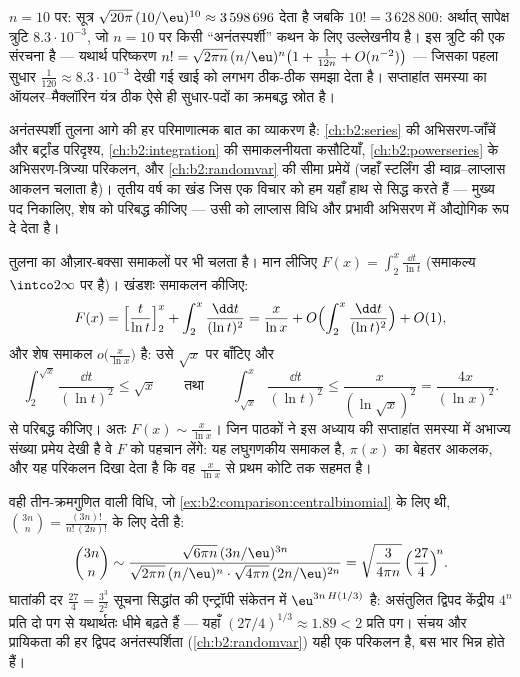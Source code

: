 \begin{example}[संख्याओं में स्टर्लिंग]\label{ex:b2:comparison:stirlingnum}
$n = 10$ पर: सूत्र $\sqrt{20\pi}\,(10/\eu)^{10}
\approx 3\,598\,696$ देता है जबकि $10! = 3\,628\,800$: अर्थात् सापेक्ष त्रुटि $8.3\cdot10^{-3}$, जो
$n = 10$ पर किसी ``अनंतस्पर्शी'' कथन के लिए उल्लेखनीय है। इस त्रुटि की एक
संरचना है --- यथार्थ परिष्करण $n!
= \sqrt{2\pi n}\,(n/\eu)^n\bigl(1 + \frac1{12n} +
O(n^{-2})\bigr)$ --- जिसका पहला सुधार $\frac1{120} \approx
8.3\cdot10^{-3}$ देखी गई खाई
को लगभग ठीक-ठीक समझा देता है। सप्ताहांत समस्या का ऑयलर--मैक्लॉरिन यंत्र
ठीक ऐसे ही सुधार-पदों का क्रमबद्ध स्रोत है।
\end{example}

\begin{remark}[यह अध्याय कहाँ काम आता है]
अनंतस्पर्शी तुलना आगे की हर परिमाणात्मक बात का व्याकरण है: \cref{ch:b2:series} की
अभिसरण-जाँचें और बर्ट्रांड परिदृश्य, \cref{ch:b2:integration} की समाकलनीयता कसौटियाँ, \cref{ch:b2:powerseries} के
अभिसरण-त्रिज्या परिकलन, और \cref{ch:b2:randomvar} की सीमा प्रमेयें (जहाँ स्टर्लिंग
डी म्वाव्र--लाप्लास आकलन चलाता है)। तृतीय वर्ष का खंड जिस एक विचार को हम
यहाँ हाथ से सिद्ध करते हैं --- मुख्य पद निकालिए, शेष को परिबद्ध कीजिए
--- उसी को लाप्लास विधि और प्रभावी अभिसरण में औद्योगिक रूप दे देता है।
\end{remark}

\begin{example}\label{ex:b2:comparison:liworked}
तुलना का औज़ार-बक्सा समाकलों पर भी चलता है। मान लीजिए $F(x) =
\int_2^x\frac{\dd t}{\ln t}$ (समाकल्य $\intco2\infty$
पर  है)। खंडशः समाकलन कीजिए:
\[
F(x) = \Bigl[\frac{t}{\ln t}\Bigr]_2^x +
\int_2^x\frac{\dd t}{(\ln t)^2}
= \frac{x}{\ln x} + O\Bigl(\int_2^x\frac{\dd t}{(\ln
t)^2}\Bigr) + O(1),
\]
और शेष समाकल $o\bigl(\frac{x}{\ln x}\bigr)$ है: उसे $\sqrt x$ पर बाँटिए और
\[
\int_2^{\sqrt x}\frac{\dd t}{(\ln t)^2} \leq \sqrt x
\qquad\text{तथा}\qquad
\int_{\sqrt x}^{x}\frac{\dd t}{(\ln t)^2} \leq
\frac{x}{(\ln\sqrt x)^2} = \frac{4x}{(\ln x)^2} .
\]
से परिबद्ध कीजिए। अतः $F(x) \sim \frac{x}{\ln x}$। जिन पाठकों ने इस अध्याय की सप्ताहांत समस्या
में अभाज्य संख्या प्रमेय देखी है वे $F$ को पहचान लेंगे: यह लघुगणकीय
समाकल है, $\pi(x)$ का बेहतर आकलक, और यह परिकलन दिखा देता है कि वह $\frac{x}{\ln x}$ से
प्रथम कोटि तक सहमत है।
\end{example}

\begin{example}[किसी असंतुलित द्विपद पर स्टर्लिंग]\label{ex:b2:comparison:lopsided}
वही तीन-क्रमगुणित वाली विधि, जो \cref{ex:b2:comparison:centralbinomial} के लिए थी, $\binom{3n}{n} = \frac{(3n)!}{n!\,(2n)!}$ के लिए देती है:
\[
\binom{3n}{n} \sim
\frac{\sqrt{6\pi n}\,(3n/\eu)^{3n}}
{\sqrt{2\pi n}\,(n/\eu)^{n}\cdot\sqrt{4\pi n}\,(2n/\eu)^{2n}}
= \sqrt{\frac{3}{4\pi n}}\,
\Bigl(\frac{27}{4}\Bigr)^{\!n} .
\]
घातांकी दर $\frac{27}4 = \frac{3^3}{2^2}$ सूचना सिद्धांत की एन्ट्रॉपी संकेतन में $\eu^{3n\,H(1/3)}$ है: असंतुलित
द्विपद केंद्रीय $4^n$ प्रति दो पग से यथार्थतः धीमे बढ़ते हैं --- यहाँ $(27/4)^{1/3} \approx 1.89 < 2$
प्रति पग। संचय और प्रायिकता की हर द्विपद अनंतस्पर्शिता (\cref{ch:b2:randomvar}) यही एक
परिकलन है, बस भार भिन्न होते हैं।
\end{example}

